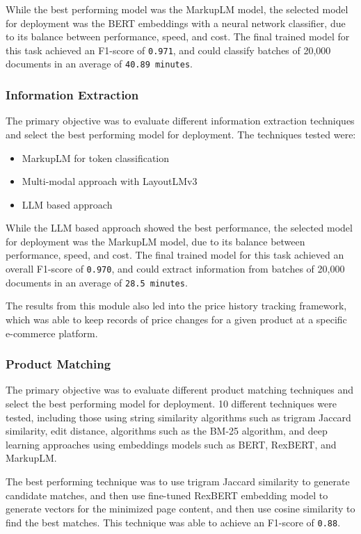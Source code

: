 While the best performing model was the MarkupLM model, the selected model for deployment was the BERT embeddings with a neural network classifier, due to its balance between performance, speed, and cost.
The final trained model for this task achieved an F1-score of \texttt{0.971}, and could classify batches of 20,000 documents in an average of \texttt{40.89 minutes}.

\subsubsection{Information Extraction}
The primary objective was to evaluate different information extraction techniques and select the best performing model for deployment.
The techniques tested were:
\begin{itemize}
    \item MarkupLM for token classification
    \item Multi-modal approach with LayoutLMv3
    \item LLM based approach
\end{itemize}

While the LLM based approach showed the best performance, the selected model for deployment was the MarkupLM model, due to its balance between performance, speed, and cost.
The final trained model for this task achieved an overall F1-score of \texttt{0.970}, and could extract information from batches of 20,000 documents in an average of \texttt{28.5 minutes}.

The results from this module also led into the price history tracking framework, which was able to keep records of price changes for a given product at a specific e-commerce platform.

\subsubsection{Product Matching}
The primary objective was to evaluate different product matching techniques and select the best performing model for deployment.
10 different techniques were tested, including those using string similarity algorithms such as trigram Jaccard similarity, edit distance, algorithms such as the BM-25 algorithm, and deep learning approaches using embeddings models such as BERT, RexBERT, and MarkupLM.

The best performing technique was to use trigram Jaccard similarity to generate candidate matches, and then use fine-tuned RexBERT embedding model to generate vectors for the minimized page content, and then use cosine similarity to find the best matches.
This technique was able to achieve an F1-score of \texttt{0.88}.

